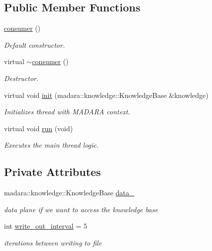 \subsection*{Public Member Functions}
\begin{DoxyCompactItemize}
\item 
\hyperlink{classthreads_1_1consumer_ae795f2bfd6ded2964f571809e0ea6561}{consumer} ()
\begin{DoxyCompactList}\small\item\em Default constructor. \end{DoxyCompactList}\item 
virtual \hyperlink{classthreads_1_1consumer_aa486915092ce609c11e35b6ac8ae5fe7}{$\sim$consumer} ()
\begin{DoxyCompactList}\small\item\em Destructor. \end{DoxyCompactList}\item 
virtual void \hyperlink{classthreads_1_1consumer_a5c5687cb634bb59115d81e81def30a01}{init} (madara\+::knowledge\+::\+Knowledge\+Base \&knowledge)
\begin{DoxyCompactList}\small\item\em Initializes thread with M\+A\+D\+A\+RA context. \end{DoxyCompactList}\item 
virtual void \hyperlink{classthreads_1_1consumer_aa845379e92c8bb14cd72cb922555c2ec}{run} (void)
\begin{DoxyCompactList}\small\item\em Executes the main thread logic. \end{DoxyCompactList}\end{DoxyCompactItemize}
\subsection*{Private Attributes}
\begin{DoxyCompactItemize}
\item 
madara\+::knowledge\+::\+Knowledge\+Base \hyperlink{classthreads_1_1consumer_ad2ecf700b19fbc6c17f3de8b2e45f39a}{data\+\_\+}
\begin{DoxyCompactList}\small\item\em data plane if we want to access the knowledge base \end{DoxyCompactList}\item 
int \hyperlink{classthreads_1_1consumer_a05d8e8f864be3a9abe4ea6d09dfad46c}{write\+\_\+out\+\_\+interval} = 5
\begin{DoxyCompactList}\small\item\em iterations between writing to file \end{DoxyCompactList}\end{DoxyCompactItemize}



